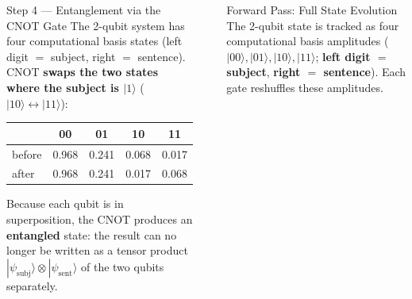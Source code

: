 \documentclass[final]{beamer}
\newlength{\sepwidth}
\newlength{\colwidth}
\newcommand{\separatorcolumn}{\begin{column}{\sepwidth}\end{column}}
\begin{document}
\begin{frame}[t]
\begin{columns}[t]
\begin{column}{\colwidth}
\begin{alertblock}{Step 4 --- Entanglement via the CNOT Gate}
    The 2-qubit system has four computational basis states (left digit $=$ subject,
    right $=$ sentence). CNOT \textbf{swaps the two states where the subject is $|1\rangle$}
    ($|10\rangle\leftrightarrow|11\rangle$):
    \begin{center}\large
      \begin{tabular}{lcccc}
        \toprule
         & \textbf{00} & \textbf{01} & \cellcolor{hi!40}\textbf{10} & \cellcolor{hi!40}\textbf{11}\\
        \midrule
        before & 0.968 & 0.241 & \cellcolor{hi!40}0.068 & \cellcolor{hi!40}0.017\\
        after  & 0.968 & 0.241 & \cellcolor{hi!40}0.017 & \cellcolor{hi!40}0.068\\
        \bottomrule
      \end{tabular}
    \end{center}

    Because each qubit is in superposition, the CNOT produces an
    \textbf{entangled} state: the result can no longer be written as a
    tensor product $|\psi_{\mathrm{subj}}\rangle\otimes|\psi_{\mathrm{sent}}\rangle$
    of the two qubits separately.
  \end{alertblock}

\end{column}

\separatorcolumn

\begin{column}{\colwidth}

  \begin{block}{Forward Pass: Full State Evolution}
    The 2-qubit state is tracked as four computational basis amplitudes
    ($|00\rangle,|01\rangle,|10\rangle,|11\rangle$;
    \textbf{left digit $=$ \color{nouncol}subject}, \textbf{right $=$
    \color{verbcol}sentence}). Each gate reshuffles these amplitudes.


\end{block}
\end{column}
\end{columns}
\end{frame}
\end{document}
